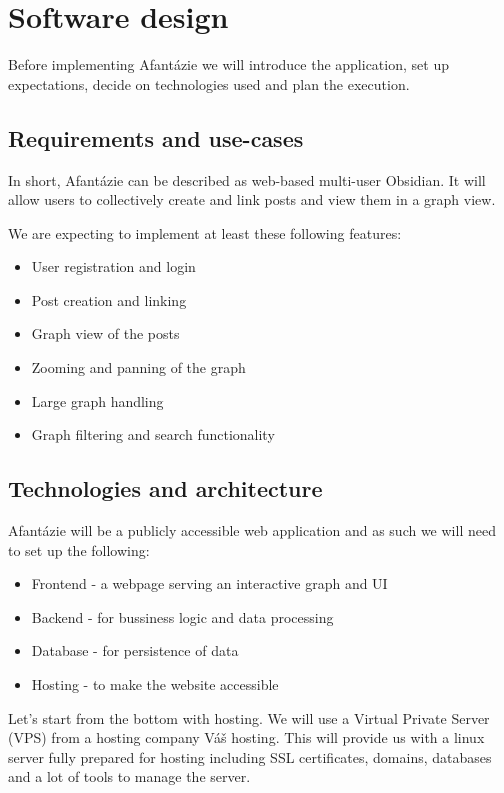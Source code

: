 \chapter{Software design}

Before implementing Afantázie we will introduce the application, set up expectations, decide on technologies used and plan the execution.

\section{Requirements and use-cases}

In short, Afantázie can be described as web-based multi-user Obsidian.
It will allow users to collectively create and link posts and view them in a graph view.

We are expecting to implement at least these following features:
\begin{itemize}
  \item User registration and login
  \item Post creation and linking
  \item Graph view of the posts
  \item Zooming and panning of the graph
  \item Large graph handling
  \item Graph filtering and search functionality
\end{itemize}

\section{Technologies and architecture}

Afantázie will be a publicly accessible web application and as such we will need to set up the following:
\begin{itemize}
  \item Frontend - a webpage serving an interactive graph and UI
  \item Backend - for bussiness logic and data processing
  \item Database - for persistence of data
  \item Hosting - to make the website accessible
\end{itemize}

Let's start from the bottom with hosting.
We will use a Virtual Private Server (VPS) from a hosting company Váš hosting.
This will provide us with a linux server fully prepared for hosting including
SSL certificates, domains, databases and a lot of tools to manage the server.

